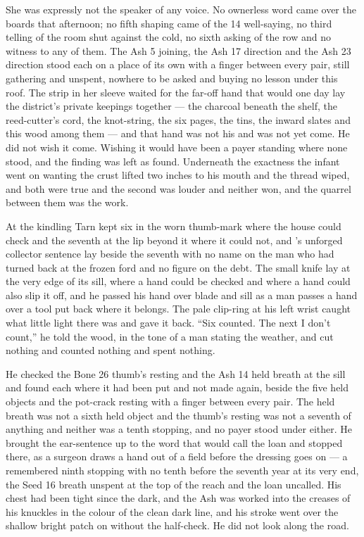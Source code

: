 She was expressly not the speaker of any voice. No ownerless word came over the boards that afternoon; no fifth shaping came of the  14 well-saying, no third telling of the room shut against the cold, no sixth asking of the row and no witness to any of them. The Ash 5 joining, the Ash 17 direction and the Ash 23 direction stood each on a place of its own with a finger between every pair, still gathering and unspent, nowhere to be asked and buying no lesson under this roof. The strip in her sleeve waited for the far-off hand that would one day lay the district's private keepings together --- the charcoal beneath the shelf, the reed-cutter's cord, the knot-string, the six pages, the tins, the inward slates and this wood among them --- and that hand was not his and was not yet come. He did not wish it come. Wishing it would have been a payer standing where none stood, and the finding was left as found. Underneath the exactness the infant went on wanting the crust lifted two inches to his mouth and the thread wiped, and both were true and the second was louder and neither won, and the quarrel between them was the work.

\scenebreak

At the kindling Tarn kept six in the worn thumb-mark where the house could check and the seventh at the lip beyond it where it could not, and 's unforged collector sentence lay beside the seventh with no name on the man who had turned back at the frozen ford and no figure on the debt. The small knife lay at the very edge of its sill, where a hand could be checked and where a hand could also slip it off, and he passed his hand over blade and sill as a man passes a hand over a tool put back where it belongs. The pale clip-ring at his left wrist caught what little light there was and gave it back. “Six counted. The next I don't count,” he told the wood, in the tone of a man stating the weather, and cut nothing and counted nothing and spent nothing.

He checked the Bone 26 thumb's resting and the Ash 14 held breath at the sill and found each where it had been put and not made again, beside the five held objects and the pot-crack resting with a finger between every pair. The held breath was not a sixth held object and the thumb's resting was not a seventh of anything and neither was a tenth stopping, and no payer stood under either. He brought the ear-sentence up to the word that would call the loan and stopped there, as a surgeon draws a hand out of a field before the dressing goes on --- a remembered ninth stopping with no tenth before the seventh year at its very end, the Seed 16 breath unspent at the top of the reach and the loan uncalled. His chest had been tight since the dark, and the Ash was worked into the creases of his knuckles in the colour of the clean dark line, and his stroke went over the shallow bright patch on  without the half-check. He did not look along the road.

